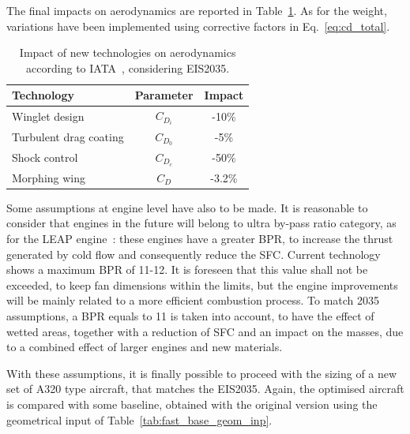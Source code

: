 The final impacts on aerodynamics are reported in Table~\ref{tab:2035_aero_impact}.
As for the weight, variations have been implemented using corrective factors in Eq.~\eqref{eq:cd_total}. 
\begin{table}[!h]
	\centering
	\begin{tabular}{l c c}
		\hline
		\textbf{Technology} & \textbf{Parameter} & \textbf{Impact} \\
		\hline
		Winglet design & $C_{D_{i}}$ & -10\% \\
		Turbulent drag coating & $C_{D_{0}}$ & -5\% \\
		Shock control & $C_{D_{c}}$ & -50\% \\
		Morphing wing & $C_D$ & -3.2\% \\
		\hline
	\end{tabular}
	\caption{Impact of new technologies on aerodynamics according to IATA~\cite{bib:iata_annex}, considering EIS2035.}
	\label{tab:2035_aero_impact}
\end{table}

Some assumptions at engine level have also to be made. 
It is reasonable to consider that engines in the future will belong to ultra by-pass ratio category, as for the LEAP engine~\cite{bib:leap_engine}: these engines have a greater BPR, to increase the thrust generated by cold flow and consequently reduce the SFC. 
Current technology shows a maximum BPR of 11-12. 
It is foreseen that this value shall not be exceeded, to keep fan dimensions within the limits, but the engine improvements will be mainly related to a more efficient combustion process. 
To match 2035 assumptions, a BPR equals to 11 is taken into account, to have the effect of wetted areas, together with a reduction of SFC and an impact on the masses, due to a combined effect of larger engines and new materials. 

With these assumptions, it is finally possible to proceed with the sizing of a new set of A320 type aircraft, that matches the EIS2035. 
Again, the optimised aircraft is compared with some baseline, obtained with the original version using the geometrical input of Table~\ref{tab:fast_base_geom_inp}. 


